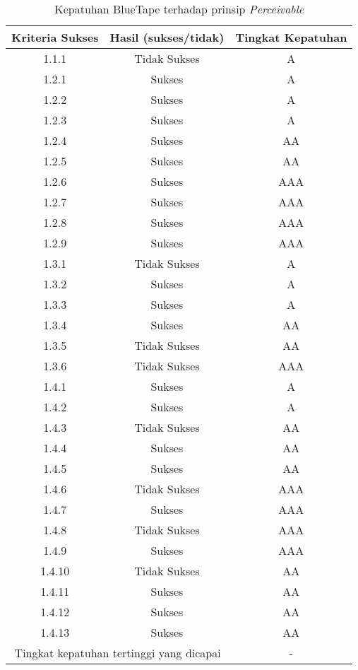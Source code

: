 \begin{table}[H]
    \centering 
    \caption{Kepatuhan BlueTape terhadap prinsip \textit{Perceivable}}
    \label{tab:kepatuhan_bluetape_perceivable}
    \begin{tabular}{|c|c|c|}
        \toprule
        Kriteria Sukses & Hasil (sukses/tidak) & Tingkat Kepatuhan \\

        \midrule
        \rowcolor{darkred} 1.1.1 & Tidak Sukses & A \\
        1.2.1 & Sukses & A \\
        1.2.2 & Sukses & A \\
        1.2.3 & Sukses & A \\
        1.2.4 & Sukses & AA \\
        1.2.5 & Sukses & AA \\
        1.2.6 & Sukses & AAA \\
        1.2.7 & Sukses & AAA \\
        1.2.8 & Sukses & AAA \\
        1.2.9 & Sukses & AAA \\
        \rowcolor{darkred} 1.3.1 & Tidak Sukses & A \\
        1.3.2 & Sukses & A \\
        1.3.3 & Sukses & A \\
        1.3.4 & Sukses & AA \\
        \rowcolor{brightred} 1.3.5 & Tidak Sukses & AA \\
        \rowcolor{pink} 1.3.6 & Tidak Sukses & AAA \\
        1.4.1 & Sukses & A \\
        1.4.2 & Sukses & A \\
        \rowcolor{brightred} 1.4.3 & Tidak Sukses & AA \\
        1.4.4 & Sukses & AA \\
        1.4.5 & Sukses & AA \\
        \rowcolor{pink} 1.4.6 & Tidak Sukses & AAA \\
        1.4.7 & Sukses & AAA \\
        \rowcolor{pink} 1.4.8 & Tidak Sukses & AAA \\
        1.4.9 & Sukses & AAA \\
        \rowcolor{brightred} 1.4.10 & Tidak Sukses & AA \\
        1.4.11 & Sukses & AA \\
        1.4.12 & Sukses & AA \\
        1.4.13 & Sukses & AA \\
        
        \bottomrule
        \multicolumn{2}{|c|}{Tingkat kepatuhan tertinggi yang dicapai} & - \\
        \bottomrule

    \end{tabular}
\end{table}

